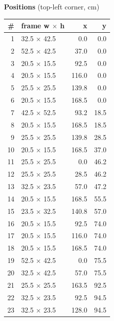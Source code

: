 \documentclass[a4paper,landscape,10pt]{article}
\begin{document}
\begin{minipage}[t]{0.25\textwidth}
\vspace{8pt}
{\bfseries Positions} (top-left corner, cm)\\[2pt]
\tiny
\begin{tabular}{@{}r l r r@{}}
\toprule
\# & frame w $\times$ h & x & y \\
\midrule
1 & 32.5 $\times$ 42.5 & 0.0 & 0.0 \\
2 & 52.5 $\times$ 42.5 & 37.0 & 0.0 \\
3 & 20.5 $\times$ 15.5 & 92.5 & 0.0 \\
4 & 20.5 $\times$ 15.5 & 116.0 & 0.0 \\
5 & 25.5 $\times$ 25.5 & 139.8 & 0.0 \\
6 & 20.5 $\times$ 15.5 & 168.5 & 0.0 \\
7 & 42.5 $\times$ 52.5 & 93.2 & 18.5 \\
8 & 20.5 $\times$ 15.5 & 168.5 & 18.5 \\
9 & 25.5 $\times$ 25.5 & 139.8 & 28.5 \\
10 & 20.5 $\times$ 15.5 & 168.5 & 37.0 \\
11 & 25.5 $\times$ 25.5 & 0.0 & 46.2 \\
12 & 25.5 $\times$ 25.5 & 28.5 & 46.2 \\
13 & 32.5 $\times$ 23.5 & 57.0 & 47.2 \\
14 & 20.5 $\times$ 15.5 & 168.5 & 55.5 \\
15 & 23.5 $\times$ 32.5 & 140.8 & 57.0 \\
16 & 20.5 $\times$ 15.5 & 92.5 & 74.0 \\
17 & 20.5 $\times$ 15.5 & 116.0 & 74.0 \\
18 & 20.5 $\times$ 15.5 & 168.5 & 74.0 \\
19 & 52.5 $\times$ 42.5 & 0.0 & 75.5 \\
20 & 32.5 $\times$ 42.5 & 57.0 & 75.5 \\
21 & 25.5 $\times$ 25.5 & 163.5 & 92.5 \\
22 & 32.5 $\times$ 23.5 & 92.5 & 94.5 \\
23 & 32.5 $\times$ 23.5 & 128.0 & 94.5 \\
\bottomrule
\end{tabular}
\end{minipage}
\clearpage
\end{document}
